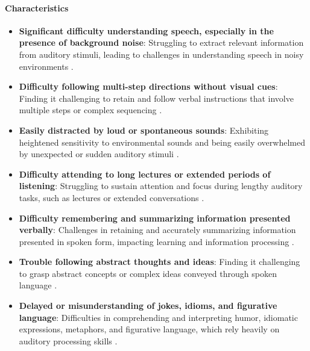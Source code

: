 \paragraph{Characteristics}
\begin{itemize}
    \item \textbf{Significant difficulty understanding speech, especially in the presence of background noise}: Struggling to extract relevant information from auditory stimuli, leading to challenges in understanding speech in noisy environments \cite{Nationwide}.
    \item \textbf{Difficulty following multi-step directions without visual cues}: Finding it challenging to retain and follow verbal instructions that involve multiple steps or complex sequencing \cite{KidsHealth}.
    \item \textbf{Easily distracted by loud or spontaneous sounds}: Exhibiting heightened sensitivity to environmental sounds and being easily overwhelmed by unexpected or sudden auditory stimuli \cite{WebMD}.
    \item \textbf{Difficulty attending to long lectures or extended periods of listening}: Struggling to sustain attention and focus during lengthy auditory tasks, such as lectures or extended conversations \cite{Nationwide}.
    \item \textbf{Difficulty remembering and summarizing information presented verbally}: Challenges in retaining and accurately summarizing information presented in spoken form, impacting learning and information processing \cite{WebMD}.
    \item \textbf{Trouble following abstract thoughts and ideas}: Finding it challenging to grasp abstract concepts or complex ideas conveyed through spoken language \cite{HearingHealth}.
    \item \textbf{Delayed or misunderstanding of jokes, idioms, and figurative language}: Difficulties in comprehending and interpreting humor, idiomatic expressions, metaphors, and figurative language, which rely heavily on auditory processing skills \cite{Nationwide}.
\end{itemize}

